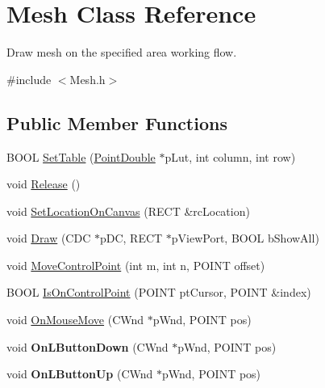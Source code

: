 \hypertarget{class_mesh}{}\section{Mesh Class Reference}
\label{class_mesh}


Draw mesh on the specified area working flow.  




{\ttfamily \#include $<$Mesh.\+h$>$}

\subsection*{Public Member Functions}
\begin{DoxyCompactItemize}
\item 
B\+O\+OL \mbox{\hyperlink{class_mesh_a79aa8ef87d68988f999a00bfea114632}{Set\+Table}} (\mbox{\hyperlink{struct___point_double}{Point\+Double}} $\ast$p\+Lut, int column, int row)
\item 
void \mbox{\hyperlink{class_mesh_a2c9670a5720afe8ee5bcaa6c433455d5}{Release}} ()
\item 
void \mbox{\hyperlink{class_mesh_a28a00f1a751e2a5cca3425670befc376}{Set\+Location\+On\+Canvas}} (R\+E\+CT \&rc\+Location)
\item 
void \mbox{\hyperlink{class_mesh_ab55d4ba1fb6a9e49651dc4801392df6d}{Draw}} (C\+DC $\ast$p\+DC, R\+E\+CT $\ast$p\+View\+Port, B\+O\+OL b\+Show\+All)
\item 
void \mbox{\hyperlink{class_mesh_a40ac4b15e3c738aab4c701d774e65ce9}{Move\+Control\+Point}} (int m, int n, P\+O\+I\+NT offset)
\item 
B\+O\+OL \mbox{\hyperlink{class_mesh_a945caa648924bf3336a54c075b83e019}{Is\+On\+Control\+Point}} (P\+O\+I\+NT pt\+Cursor, P\+O\+I\+NT \&index)
\item 
void \mbox{\hyperlink{class_mesh_ad644e7f3d14e64774bc32c356898109c}{On\+Mouse\+Move}} (C\+Wnd $\ast$p\+Wnd, P\+O\+I\+NT pos)
\item 
\mbox{\label{class_mesh_af80676782b87f7a31b7c8d6d0fbe29af}} 
void {\bfseries On\+L\+Button\+Down} (C\+Wnd $\ast$p\+Wnd, P\+O\+I\+NT pos)
\item 
\mbox{\label{class_mesh_a7cd53f709a59db03c99998e0402e9852}} 
void {\bfseries On\+L\+Button\+Up} (C\+Wnd $\ast$p\+Wnd, P\+O\+I\+NT pos)
\end{DoxyCompactItemize}



